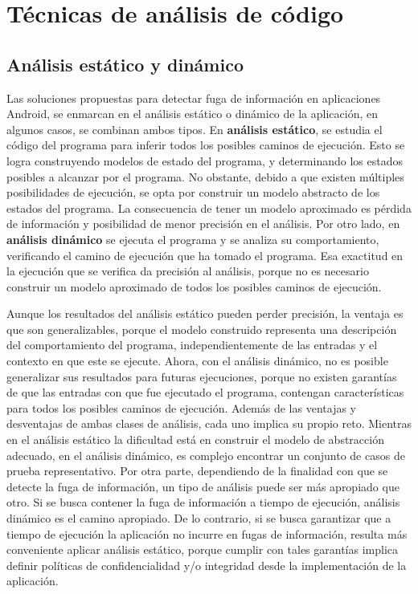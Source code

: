 \section{Técnicas de análisis de código}
\label{sec:contexto}
\subsection{Análisis estático y dinámico}

Las soluciones propuestas para detectar fuga de información en aplicaciones
Android, se enmarcan en el análisis estático o dinámico de la aplicación, en
algunos casos, se combinan ambos tipos.\newline 
En \textbf{análisis estático}\cite{Static-dynamic}, se estudia el código del
programa para inferir todos los posibles caminos de ejecución. Esto se logra
construyendo modelos de estado del programa, y determinando los estados posibles
a alcanzar por el programa.
No obstante, debido a que existen múltiples posibilidades de ejecución, se opta
por construir un modelo abstracto de los estados del programa. La consecuencia
de tener un modelo aproximado es pérdida de información y posibilidad de menor
precisión en el análisis.\newline 
Por otro lado, en \textbf{análisis dinámico} se ejecuta el programa y se analiza
su comportamiento, verificando el camino de ejecución que ha tomado el programa.
Esa exactitud en la ejecución que se verifica da precisión al análisis, porque
no es necesario construir un modelo aproximado de todos los posibles caminos de
ejecución.

Aunque los resultados del análisis estático pueden perder precisión, la ventaja
es que son generalizables, porque el modelo construido representa una
descripción del comportamiento del programa, independientemente de las entradas
y el contexto en que este se ejecute. Ahora, con el análisis dinámico, no es
posible generalizar sus resultados para futuras ejecuciones, porque no
existen garantías de que las entradas con que fue ejecutado el programa,
contengan características para todos los posibles caminos de ejecución.\newline 
Además de las ventajas y desventajas de ambas clases de análisis, cada uno
implica su propio reto. Mientras en el análisis estático la dificultad está
en construir el modelo de abstracción adecuado, en el análisis dinámico, es
complejo encontrar un conjunto de casos de prueba representativo.\newline
Por otra parte, dependiendo de la finalidad con que se detecte la fuga de
información, un tipo de análisis puede ser más apropiado que otro. Si se busca
contener la fuga de información a tiempo de ejecución, análisis dinámico es el
camino apropiado. 
De lo contrario, si se busca garantizar que a tiempo de
ejecución la aplicación no incurre en fugas de información, resulta más
conveniente aplicar análisis estático, porque cumplir con tales garantías
implica definir políticas de confidencialidad y/o integridad desde la
implementación de la aplicación\cite{DD2460}\cite{information-flow-control}.

